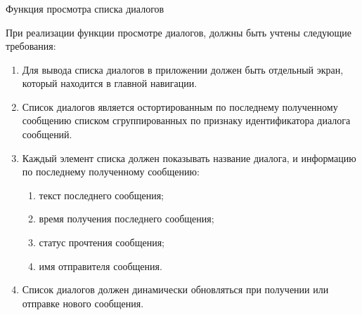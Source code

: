 \subsubsection{} Функция просмотра списка диалогов
\label{sec:analysis:research:funcreq:dialogueslist}

При реализации функции просмотре диалогов, должны быть учтены следующие требования:

\begin{enumerate}
	\item Для вывода списка диалогов в приложении должен быть отдельный экран, который находится в главной навигации.
	\item Список диалогов является остортированным по последнему полученному сообщению списком сгруппированных по признаку идентификатора диалога сообщений.
	\item Каждый элемент списка должен показывать название диалога, и информацию по последнему полученному сообщению:
	\begin{enumerate}
		\item текст последнего сообщения;
		\item время получения последнего сообщения;
		\item статус прочтения сообщения;
		\item имя отправителя сообщения.
	\end{enumerate}
	\item Список диалогов должен динамически обновляться при получении или отправке нового сообщения.
\end{enumerate}
